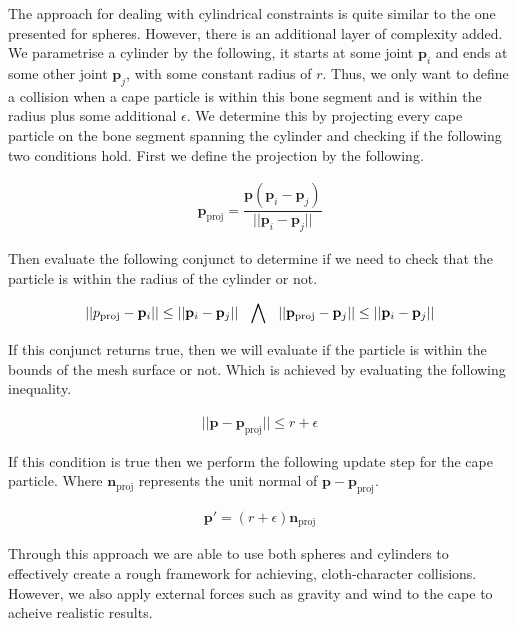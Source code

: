 \documentclass{article}
\begin{document}
The approach for dealing with cylindrical constraints is quite similar to the one presented for spheres. 
However, there is an additional layer of complexity added. We parametrise a cylinder by the following, it
starts at some joint $\mathbf{p}_i$ and ends at some other joint $\mathbf{p}_j$, with some constant radius
of $r$. Thus, we only want to define a collision when a cape particle is within this bone segment and is
within the radius plus some additional $\epsilon$. We determine this by projecting every cape particle on
the bone segment spanning the cylinder and checking if the following two conditions hold. First we define
the projection by the following.

\begin{align}
  \mathbf{p}_{\text{proj}} = \dfrac{\mathbf{p} (\mathbf{p}_i - \mathbf{p}_j)}{||\mathbf{p}_i - \mathbf{p}_j||}
\end{align}

Then evaluate the following conjunct to determine if we need to check that the particle is within the radius
of the cylinder or not.

\begin{align}
  || p_{\text{proj}} - \mathbf{p}_i || \leq ||\mathbf{p}_i - \mathbf{p}_j||  \hspace{2.5mm}  \bigwedge \hspace{2.5mm} || \mathbf{p}_{\text{proj}} - \mathbf{p}_j ||  \leq ||\mathbf{p}_i - \mathbf{p}_j|| 
\end{align}

If this conjunct returns true, then we will evaluate if the particle is within the bounds of the mesh surface or
not. Which is achieved by evaluating the following inequality.

\begin{align}
  || \mathbf{p} - \mathbf{p}_{\text{proj}} || \leq r + \epsilon
\end{align}

If this condition is true then we perform the following update step for the cape particle. Where $\mathbf{n}_{\text{proj}}$
represents the unit normal of $\mathbf{p} - \mathbf{p}_{\text{proj}}$.

\begin{align}
  \mathbf{p}' = (r + \epsilon) \mathbf{n}_{\text{proj}}
\end{align}

Through this approach we are able to use both spheres and cylinders to effectively create a rough framework
for achieving, cloth-character collisions. However, we also apply external forces such as gravity and wind to
the cape to acheive realistic results.
\end{document}
